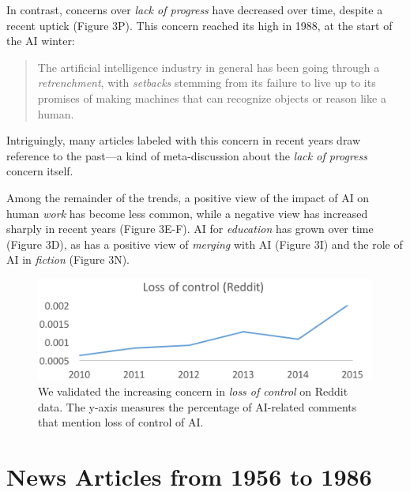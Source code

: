 \documentclass[letterpaper]{article}
\begin{document}
In contrast, concerns over \textit{lack of progress} have decreased over time, despite a recent uptick (Figure 3P). This concern reached its high in 1988, at the start of the AI winter: 
\begin{quote}
\small
The artificial intelligence industry in general has been going through a \textit{retrenchment}, with \textit{setbacks} stemming from its failure to live up to its promises of making machines that can recognize objects or reason like a human.
\normalsize
\end{quote}
Intriguingly, many articles labeled with this concern in recent years draw reference to the past---a kind of meta-discussion about the \textit{lack of progress} concern itself. 

Among the remainder of the trends, a positive view of the impact of AI on human \textit{work} has become less common, while a negative view has increased sharply in recent years (Figure 3E-F). AI for \textit{education} has grown over time (Figure 3D), as has a positive view of \textit{merging} with AI (Figure 3I) and the role of AI in \textit{fiction} (Figure 3N).

\begin{figure}[!t]
\centering
\includegraphics[width=1.0\columnwidth]{ai-reddit2}
\caption{We validated the increasing concern in \textit{loss of control} on Reddit data. The y-axis measures the percentage of AI-related comments that mention loss of control of AI.}
\label{fig:replicate}
\end{figure}

\section{News Articles from 1956 to 1986}
\end{document}
